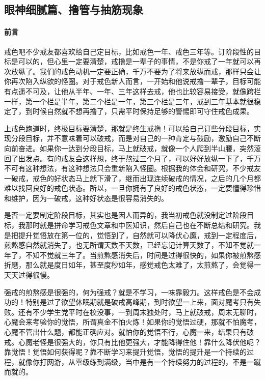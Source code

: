 \subsection{眼神细腻篇、撸管与抽筋现象}

\paragraph*{前言}

戒色吧不少戒友都喜欢给自己定目标，比如戒色一年、戒色三年等。订阶段性的目标是可以的，但心里一定要清楚，戒撸是一辈子的事情，不是你戒了一年就可以再次放纵了。我们的戒色动机一定要正确，千万不要为了将来放纵而戒，那样只会让你再次陷入纵欲的怪圈。对于戒色新人而言，一开始和他说戒撸一辈子，目标可能有点遥不可及，让他从半年、一年、三年这样去戒，他也比较容易接受，就像跨栏一样，第一个栏是半年，第二个栏是一年，第三个栏是三年，戒到三年基本就很稳定了，到时候自然就不想再撸了，只需平时保持足够的警惕即可守住戒色成果。

上戒色跑道时，终极目标要清楚，那就是终生戒撸！可以给自己订些分段目标，实现分段目标，并不意味着可以破戒，而是对自己的一种肯定与鼓励，激励自己不断向前奋进。如果你一达到分段目标，马上就破戒，就像一个人爬到半山腰，突然滚回了出发点。有的戒友会这样想，终于熬过三个月了，可以好好放纵一下了，千万不可有这种想法，有这种想法只会重新陷入怪圈。根据我的体会和研究，不少戒友一破戒，戒色的好状态马上就下滑了，继而出现连续破戒的情况，之后的几个月都难以找回良好的戒色状态。所以，一旦你拥有了良好的戒色状态，一定要懂得珍惜和维护，因为一破戒，这种好状态是很容易消失的。

是否一定要制定阶段目标，其实也是因人而异的，我当初戒色就没制定过阶段目标，我那时就是拼命学习戒色文章和中医知识，然后自己也在不断总结和研究。我是把提升觉悟放在第一位的，觉悟到了，自然就可以降伏心魔，戒到一定程度后，煎熬感自然就消失了，也无所谓天数不天数，已经忘记计算天数了，不知不觉就一年了，不知不觉就三年了。当煎熬感消失后，时间是过得很快的，如果你被煎熬感折磨，那么就是度日如年，甚至度秒如年，感觉戒色太难了，太煎熬了，会觉得一天天过得很慢。

强戒的煎熬感是很强的，何为强戒？就是不学习，一味靠毅力。这样戒色是不会成功的！特别是过了欲望休眠期就是破戒高峰期，到时欲望一上来，面对魔考只有失败。还有不少学生党平时在校没事，一到周末独处时，马上就破戒，周末无聊时，心魔会来考验你的觉悟，所谓真金不怕火炼！如果你的觉悟过硬，那就不怕魔考，心魔不管出什么题，都能正确应对。就怕你的觉悟不行，心魔一来，结果只有破戒。心魔老怪是很强大的，你只有比他更强大，才能降得住他！靠什么降伏他呢？靠觉悟！觉悟如何获得呢？靠不断学习来提升觉悟，觉悟的提升是一个持续的过程，就像你打网游，从零级练到满级，当中是有一个持续努力的过程的，不是一蹴而就的。

